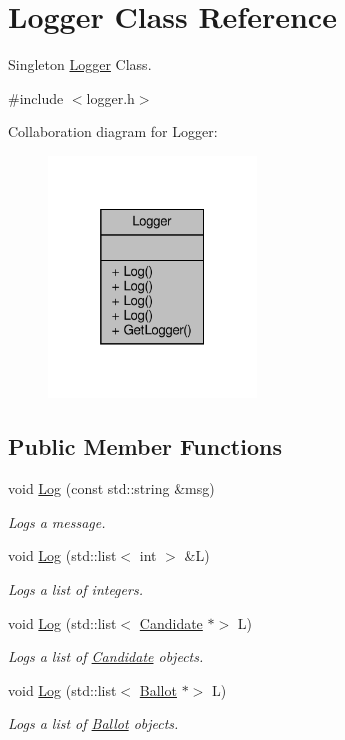 \hypertarget{classLogger}{}\section{Logger Class Reference}
\label{classLogger}


Singleton \hyperlink{classLogger}{Logger} Class.  




{\ttfamily \#include $<$logger.\+h$>$}



Collaboration diagram for Logger\+:\nopagebreak
\begin{figure}[H]
\begin{center}
\leavevmode
\includegraphics[width=157pt]{classLogger__coll__graph}
\end{center}
\end{figure}
\subsection*{Public Member Functions}
\begin{DoxyCompactItemize}
\item 
void \hyperlink{classLogger_a4c67b32e3bdb174a86e507a82d8a2702}{Log} (const std\+::string \&msg)
\begin{DoxyCompactList}\small\item\em Logs a message. \end{DoxyCompactList}\item 
void \hyperlink{classLogger_a7436e95d0e81bdb0e1b3a4c78cdb9ed2}{Log} (std\+::list$<$ int $>$ \&L)
\begin{DoxyCompactList}\small\item\em Logs a list of integers. \end{DoxyCompactList}\item 
void \hyperlink{classLogger_a5273a101444fc160d1a0935b6448e791}{Log} (std\+::list$<$ \hyperlink{classCandidate}{Candidate} $\ast$$>$ L)
\begin{DoxyCompactList}\small\item\em Logs a list of \hyperlink{classCandidate}{Candidate} objects. \end{DoxyCompactList}\item 
void \hyperlink{classLogger_a99456033df2a51e976709037ad85cd11}{Log} (std\+::list$<$ \hyperlink{classBallot}{Ballot} $\ast$$>$ L)
\begin{DoxyCompactList}\small\item\em Logs a list of \hyperlink{classBallot}{Ballot} objects. \end{DoxyCompactList}\end{DoxyCompactItemize}
